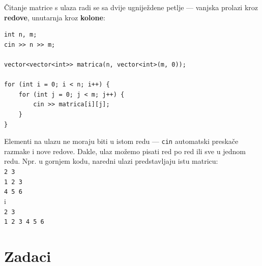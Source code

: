 \documentclass[11pt]{article}
\begin{document}
\medskip
Čitanje matrice s ulaza radi se sa dvije ugniježdene petlje —
vanjska prolazi kroz \textbf{redove}, unutarnja kroz \textbf{kolone}:

\begin{lstlisting}
int n, m;
cin >> n >> m;

vector<vector<int>> matrica(n, vector<int>(m, 0));

for (int i = 0; i < n; i++) {
    for (int j = 0; j < m; j++) {
        cin >> matrica[i][j];
    }
}
\end{lstlisting}

\begin{napomena}
    Elementi na ulazu ne moraju biti u istom redu — \texttt{cin} automatski
    preskače razmake i nove redove. Dakle, ulaz možemo pisati red po red ili
    sve u jednom redu.
    Npr. u gornjem kodu, naredni ulazi predstavljaju istu matricu: \\
    \texttt{2 3}\\
    \texttt{1 2 3}\\
    \texttt{4 5 6}\\
    i \\
    \texttt{2 3}\\
    \texttt{1 2 3 4 5 6}
\end{napomena}


\newpage

\section*{Zadaci}
\end{document}

